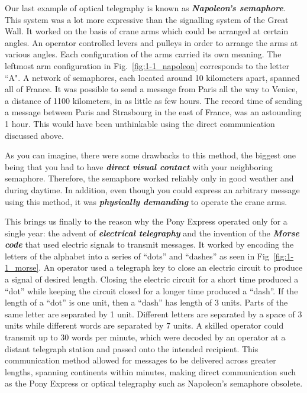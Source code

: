 Our last example of optical telegraphy is known as \textit{\textbf{Napoleon's semaphore}}.
This system was a lot more expressive than the signalling system of the Great Wall.
It worked on the basis of crane arms which could be arranged at certain angles.
An operator controlled levers and pulleys in order to arrange the arms at various angles. Each configuration of the arms carried its own meaning.
The leftmost arm configuration in Fig.~\ref{fig:1-1_napoleon} corresponds to the letter ``A".
A network of semaphores, each located around 10 kilometers apart, spanned all of France.
It was possible to send a message from Paris all the way to Venice, a distance of 1100 kilometers, in as little as few hours.
The record time of sending a message between Paris and Strasbourg in the east of France, was an astounding 1 hour.
This would have been unthinkable using the direct communication discussed above.

As you can imagine, there were some drawbacks to this method, the biggest one being that you had to have \textit{\textbf{direct visual contact}} with your neighboring semaphore.
Therefore, the semaphore worked reliably only in good weather and during daytime.
In addition, even though you could express an arbitrary message using this method, it was \textit{\textbf{physically demanding}} to operate the crane arms.

This brings us finally to the reason why the Pony Express operated only for a single year: the advent of \textit{\textbf{electrical telegraphy}} and the invention of the \textit{\textbf{Morse code}} that used electric signals to transmit messages.
It worked by encoding the letters of the alphabet into a series of ``dots'' and ``dashes'' as seen in Fig~\ref{fig:1-1_morse}.
An operator used a telegraph key to close an electric circuit to produce a signal of desired length.
Closing the electric circuit for a short time produced a ``dot'' while keeping the circuit closed for a longer time produced a ``dash''.
If the length of a ``dot'' is one unit, then a ``dash'' has length of 3 units.
Parts of the same letter are separated by 1 unit.
Different letters are separated by a space of 3 units while different words are separated by 7 units.
A skilled operator could transmit up to 30 words per minute, which were decoded by an operator at a distant telegraph station and passed onto the intended recipient.
This communication method allowed for messages to be delivered across greater lengths, spanning continents within minutes, making direct communication such as the Pony Express or optical telegraphy such as Napoleon's semaphore obsolete.

